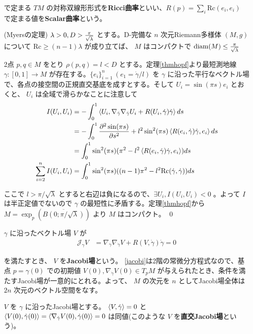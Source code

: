 \documentclass[dvipdfmx,a4paper]{jsreport}
\theoremstyle{definition}
\newcommand{\der}{\partial}
\renewcommand{\bar}{\overline}
\begin{document}
で定まる $TM$ の対称双線形形式を\textbf{Ricci曲率}といい、$R(p)=\sum_i \mbox{Rc}(e_i,e_i)$ で定まる値を\textbf{Scalar曲率}という。

\thm\label{thmmyers} (Myersの定理) $\lambda>0,D>{\pi \over \sqrt{\lambda}}$ とする。D-完備な $n$ 次元Riemann多様体 $(M,g)$ について $\mbox{Rc} \geq (n-1)\lambda$ が成り立てば、 $M$ はコンパクトで $\mbox{diam}(M) \leq {\pi \over \sqrt{\lambda}}$ 

\prf 2点 $p,q \in M$ をとり $\rho(p,q)=l<D$ とする。定理\ref{thmhopf}より最短測地線 $\gamma:[0,1] \to M$ が存在する。$\{e_i\}_{i=1}^n \ (e_1=\dot{\gamma}/l)$ を $\gamma$ に沿った平行なベクトル場で、各点の接空間の正規直交基底を成すとする。そして $U_i=\sin(\pi s)e_i$ とおくと、 $U_i$ は全域で滑らかなことに注意して
\begin{align*}
    I(U_i,U_i) &=-\int_0^1 \ev{U_i,\nabla_{\dot{\gamma}}\nabla_{\dot{\gamma}}U_i+R(U_i,\dot{\gamma})\dot{\gamma}} ds \\
    &=-\int_0^1 {\der^2 \sin(\pi s) \over \der s^2}+l^2\sin^2(\pi s) \ev{R(e_i,\dot{\gamma})\dot{\gamma},e_i} ds \\
    &=\int_0^1 \sin^2(\pi s)(\pi^2-l^2 \ev{R(e_i,\dot{\gamma})\dot{\gamma},e_i}) ds \\
    \sum_{i=2}^n I(U_i,U_i) &=\int_0^1 \sin^2(\pi s)((n-1)\pi^2-l^2 \mbox{Rc}(\dot{\gamma},\dot{\gamma})) ds
\end{align*}

ここで $l>\pi/\sqrt{\lambda}$ とすると右辺は負になるので、$\exists U_i,I(U_i,U_i)<0$ 。よって $I$ は半正定値でないので $\gamma$ の最短性に矛盾する。定理\ref{thmhopf}から $M=\exp_p(\bar{B(0;\pi/\sqrt{\lambda})})$ より $M$ はコンパクト。 \qed

 $\gamma$ に沿ったベクトル場 $V$ が 
\begin{align}\label{jacobi}
    \mathcal{J}_\gamma V &=\nabla_{\dot{\gamma}}\nabla_{\dot{\gamma}}V+R(V,{\dot{\gamma}}){\dot{\gamma}}=0
\end{align}

を満たすとき、 $V$ を\textbf{Jacobi場}という。
\ref{jacobi}は2階の常微分方程式なので、基点 $p=\gamma(0)$ での初期値 $V(0),\nabla_{\dot{\gamma}}V(0) \in T_pM$ が与えられたとき、条件を満たすJacobi場が一意的にとれる。よって、 $M$ の次元を $n$ としてJacobi場全体は $2n$ 次元のベクトル空間をなす。

\lem\label{lemnormal} $V$ を $\gamma$ に沿ったJacobi場とする。
$\ev{V,\dot{\gamma}}=0$ と $\ev{V(0),\dot{\gamma}(0)}=\ev{\nabla_{\dot{\gamma}}V(0),\dot{\gamma}(0)}=0$ は同値(このような $V$ を\textbf{直交Jacobi場}という)。
\end{document}
